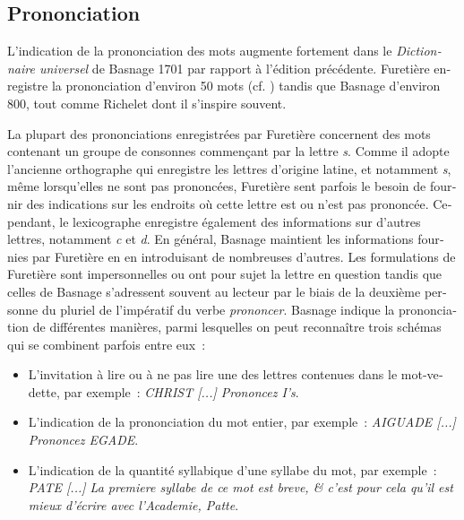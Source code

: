 \documentclass[output=paper,colorlinks,citecolor=brown,arabicfont,chinesefont,booklanguage=french]{langscibook}
\begin{document}
\begin{otherlanguage}{french}
\section{Prononciation}

L'indication de la prononciation des mots augmente fortement dans le \textit{Dictionnaire universel} de Basnage 1701 par rapport à l’édition précédente. Furetière enregistre la prononciation d’environ 50 mots (cf. \citealt{Rey2020})  tandis que Basnage d'environ 800, tout comme Richelet dont il s’inspire souvent.

La plupart des prononciations enregistrées par Furetière concernent des mots contenant un groupe de consonnes commençant par la lettre \emph{s}. Comme il adopte l'ancienne orthographe qui enregistre les lettres d'origine latine, et notamment \emph{s}, même lorsqu'elles ne sont pas prononcées, Furetière sent parfois le besoin de fournir des indications sur les endroits où cette lettre est ou n'est pas prononcée. Cependant, le lexicographe enregistre également des informations sur d'autres lettres, notamment \emph{c} et \emph{d}. En général, Basnage maintient les informations fournies par Furetière en en introduisant de nombreuses d’autres. Les formulations de Furetière sont impersonnelles ou ont pour sujet la lettre en question tandis que celles de Basnage s'adressent souvent au lecteur par le biais de la deuxième personne du pluriel de l'impératif du verbe \emph{prononcer}. Basnage indique la prononciation de différentes manières, parmi lesquelles on peut reconnaître trois schémas qui se combinent parfois entre eux~:

\begin{itemize}
    \item L'invitation à lire ou à ne pas lire une des lettres contenues dans le mot-vedette, par exemple~: \emph{CHRIST [...] Prononcez I's}. 
    \item L'indication de la prononciation du mot entier, par exemple~: \emph{AIGUADE [...] Prononcez EGADE}. 
    \item L'indication de la quantité syllabique d’une syllabe du mot, par exemple~: \emph{PATE [...] La premiere syllabe de ce mot est breve, \& c'est pour cela qu'il est mieux d'écrire avec l'Academie, Patte}.
\end{itemize}


\end{otherlanguage}
\end{document}
